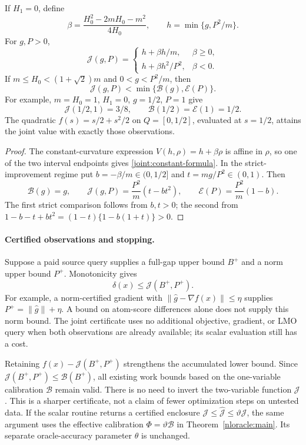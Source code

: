 \begin{corollary}
\label{joint:constant}
If $H_1=0$, define
\[
 \beta=\frac{H_0^2-2mH_0-m^2}{4H_0},\qquad
 h=\min\{g,P^2/m\}.
\]
For $g,P>0$,
\begin{equation}\label{joint:constant-formula}
 \mathcal J(g,P)=
 \begin{cases}
 h+\beta h/m,&\beta\ge0,\\
 h+\beta h^2/P^2,&\beta<0.
 \end{cases}
\end{equation}
If $m\le H_0<(1+\sqrt2)m$ and $0<g<P^2/m$, then
\[
 \mathcal J(g,P)<\min\{\mathcal B(g),\mathcal E(P)\}.
\]
For example, $m=H_0=1$, $H_1=0$, $g=1/2$, $P=1$ give
\[
 \mathcal J(1/2,1)=3/8,
 \qquad \mathcal B(1/2)=\mathcal E(1)=1/2.
\]
The quadratic $f(s)=s/2+s^2/2$ on $Q=[0,1/2]$, evaluated at
$s=1/2$, attains the joint value with exactly those observations.
\end{corollary}
\begin{proof}
The constant-curvature expression
$V(h,\rho)=h+\beta\rho$ is affine in $\rho$, so one of the
two interval endpoints gives \eqref{joint:constant-formula}.
In the strict-improvement regime put
$b=-\beta/m\in(0,1/2]$ and $t=mg/P^2\in(0,1)$. Then
\[
 \mathcal B(g)=g,\qquad
 \mathcal J(g,P)=\frac{P^2}{m}(t-bt^2),\qquad
 \mathcal E(P)=\frac{P^2}{m}(1-b).
\]
The first strict comparison follows from $b,t>0$; the second from
$1-b-t+bt^2=(1-t)\{1-b(1+t)\}>0$.
\end{proof}

\paragraph{Certified observations and stopping.}
Suppose a paid source query supplies a full-gap upper bound $B^+$ and
a norm upper bound $P^+$. Monotonicity gives
\[
 \delta(x)\le\mathcal J(B^+,P^+).
\]
For example, a norm-certified gradient with
$\|\widehat g-\nabla f(x)\|\le\eta$ supplies
$P^+=\|\widehat g\|+\eta$. A bound on atom-score differences alone
does not supply this norm bound. The joint certificate uses no
additional objective, gradient, or LMO query when both observations
are already available; its scalar evaluation still has a cost.

Retaining $f(x)-\mathcal J(B^+,P^+)$ strengthens the accumulated
lower bound. Since $\mathcal J(B^+,P^+)\le\mathcal B(B^+)$, all
existing work bounds based on the one-variable calibration
$\mathcal B$ remain valid. There is no need to invert the
two-variable function $\mathcal J$. This is a sharper certificate,
not a claim of fewer optimization steps on untested data.
If the scalar routine returns a certified enclosure
$\mathcal J\le\widehat{\mathcal J}\le\vartheta\mathcal J$,
the same argument uses the effective calibration
$\Phi=\vartheta\mathcal B$ in Theorem~\ref{nloracle:main}.
Its separate oracle-accuracy parameter $\theta$ is unchanged.

